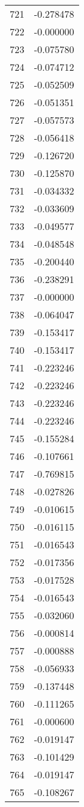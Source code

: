 \documentclass[12pt]{article}
\begin{document}
\begin{longtable}{@{}cc@{}}
721 & -0.278478 \\
722 & -0.000000 \\
723 & -0.075780 \\
724 & -0.074712 \\
725 & -0.052509 \\
726 & -0.051351 \\
727 & -0.057573 \\
728 & -0.056418 \\
729 & -0.126720 \\
730 & -0.125870 \\
731 & -0.034332 \\
732 & -0.033609 \\
733 & -0.049577 \\
734 & -0.048548 \\
735 & -0.200440 \\
736 & -0.238291 \\
737 & -0.000000 \\
738 & -0.064047 \\
739 & -0.153417 \\
740 & -0.153417 \\
741 & -0.223246 \\
742 & -0.223246 \\
743 & -0.223246 \\
744 & -0.223246 \\
745 & -0.155284 \\
746 & -0.107661 \\
747 & -0.769815 \\
748 & -0.027826 \\
749 & -0.010615 \\
750 & -0.016115 \\
751 & -0.016543 \\
752 & -0.017356 \\
753 & -0.017528 \\
754 & -0.016543 \\
755 & -0.032060 \\
756 & -0.000814 \\
757 & -0.000888 \\
758 & -0.056933 \\
759 & -0.137448 \\
760 & -0.111265 \\
761 & -0.000600 \\
762 & -0.019147 \\
763 & -0.101429 \\
764 & -0.019147 \\
765 & -0.108267 \\

\end{longtable}
\end{document}
